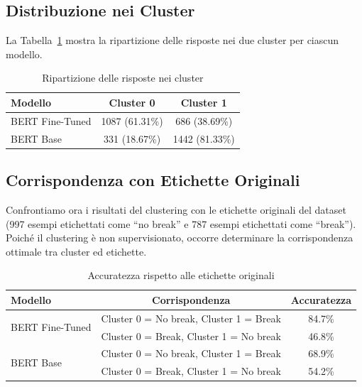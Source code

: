 \documentclass[a4paper,12pt]{article}
\begin{document}
\subsection{Distribuzione nei Cluster}
La Tabella~\ref{tab:distribuzione} mostra la ripartizione delle risposte nei due cluster per ciascun modello.

\begin{table}[htbp]
  \centering
  \caption{Ripartizione delle risposte nei cluster}
  \label{tab:distribuzione}
  \begin{tabular}{lcc}
    \hline
    \textbf{Modello} & \textbf{Cluster 0} & \textbf{Cluster 1} \\
    \hline
    BERT Fine-Tuned & 1087 (61.31\%) & 686 (38.69\%) \\
    BERT Base      & 331 (18.67\%) & 1442 (81.33\%) \\
    \hline
  \end{tabular}
\end{table}

\FloatBarrier
\subsection{Corrispondenza con Etichette Originali}
Confrontiamo ora i risultati del clustering con le etichette originali del dataset (997 esempi etichettati come ``no break'' e 787 esempi etichettati come ``break''). Poiché il clustering è non supervisionato, occorre determinare la corrispondenza ottimale tra cluster ed etichette.

\begin{table}[htbp]
  \centering
  \caption{Accuratezza rispetto alle etichette originali}
  \label{tab:accuratezza}
  \begin{tabular}{lcc}
    \hline
    \textbf{Modello} & \textbf{Corrispondenza} & \textbf{Accuratezza} \\
    \hline
    \multirow{2}{*}{BERT Fine-Tuned} & Cluster 0 = No break, Cluster 1 = Break & 84.7\% \\
                                     & Cluster 0 = Break, Cluster 1 = No break & 46.8\% \\
    \hline
    \multirow{2}{*}{BERT Base} & Cluster 0 = No break, Cluster 1 = Break & 68.9\% \\
                              & Cluster 0 = Break, Cluster 1 = No break & 54.2\% \\
    \hline
  \end{tabular}
\end{table}
\end{document}
